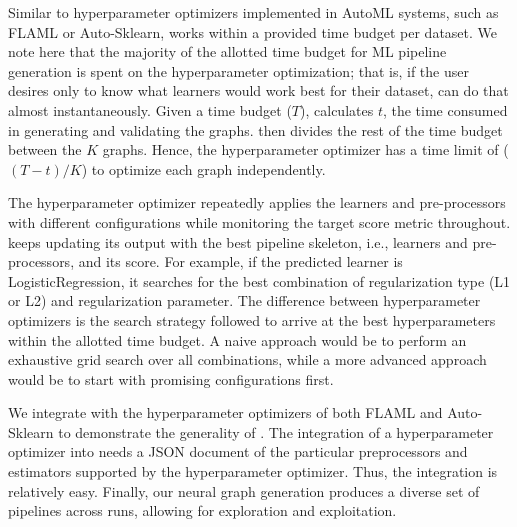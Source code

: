 Similar to hyperparameter optimizers implemented in AutoML systems, such as FLAML or Auto-Sklearn, {\sysname} works within a provided time budget per dataset. We note here that the majority of the allotted time budget for ML pipeline generation is spent on the hyperparameter optimization; that is, if the user desires only to know what learners would work best for their dataset, {\sysname} can do that almost instantaneously. Given a time budget ($T$), {\sysname} calculates $t$, the time consumed in generating and validating the graphs. {\sysname} then divides the rest of the time budget between the $K$ graphs. Hence, the hyperparameter optimizer has a time limit of ($(T-t) / K$) to optimize each graph independently.   


The hyperparameter optimizer repeatedly applies the learners and pre-processors with different configurations while monitoring the target score metric throughout. {\sysname}  keeps updating its output with the best pipeline skeleton, i.e.,  learners and pre-processors, and its score.  
For example, if the predicted learner is LogisticRegression, it searches for the best combination of regularization type (L1 or L2) and regularization parameter. The difference between hyperparameter optimizers is the search strategy followed to arrive at the best hyperparameters within the allotted time budget. A naive approach would be to perform an exhaustive grid search over all combinations, while a more advanced approach would be to start with promising configurations first.  

We integrate {\sysname} with the hyperparameter optimizers of both FLAML \cite{flaml} and Auto-Sklearn \cite{autosklearn} to demonstrate the generality of {\sysname}.
The integration of a hyperparameter optimizer into {\sysname} needs a JSON document of the particular preprocessors and estimators supported by the hyperparameter optimizer. Thus, the integration is relatively easy. Finally, our neural graph generation produces a diverse set of pipelines across runs, allowing for exploration and exploitation.

